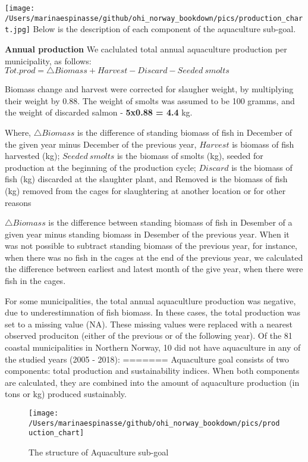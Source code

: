 \documentclass[
]{book}
\begin{document}
\texttt{[image: /Users/marinaespinasse/github/ohi\_norway\_bookdown/pics/production\_chart.jpg]}
Below is the description of each component of the aquaculture sub-goal.

\textbf{Annual production}
We caclulated total annual aquaculture production per municipality, as follows:
\(Tot.prod = \triangle Biomass + Harvest - Discard - Seeded\ smolts\)

Biomass change and harvest were corrected for slaugher weight, by multiplying their weight by 0.88.
The weight of smolts was assumed to be 100 gramms, and the weight of discarded salmon - \textbf{5x0.88 = 4.4} kg.

Where, \(\triangle Biomass\) is the difference of standing biomass of fish in December of the given year minus December of the previous year, \(Harvest\) is biomass of fish harvested (kg); \(Seeded\ smolts\) is the biomass of smolts (kg), seeded for production at the beginning of the production cycle; \(Discard\) is the biomass of fish (kg) discarded at the slaughter plant, and Removed is the biomass of fish (kg) removed from the cages for slaughtering at another location or for other reasons

\(\triangle Biomass\) is the difference between standing biomass of fish in Desember of a given year minus standing biomass in Desember of the previous year. When it was not possible to subtract standing biomass of the previous year, for instance, when there was no fish in the cages at the end of the previous year, we calculated the difference between earliest and latest month of the give year, when there were fish in the cages.

For some municipalities, the total annual aquacultlure production was negative, due to underestimnation of fish biomass. In these cases, the total production was set to a missing value (NA). These missing values were replaced with a nearest observed produciton (either of the previous or of the following year).
Of the 81 coastal municipalities in Northern Norway, 10 did not have aquaculture in any of the studied years (2005 - 2018):
=======
Aquaculture goal consists of two components: total production and sustainability indices. When both components are calculated, they are combined into the amount of aquaculture production (in tons or kg) produced sustainably.

\begin{figure}

{\centering \texttt{[image: /Users/marinaespinasse/github/ohi\_norway\_bookdown/pics/production\_chart]} 

}

\caption{The structure of Aquaculture sub-goal}\label{fig:akva-fig}
\end{figure}
\end{document}
